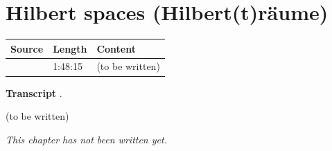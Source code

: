 \chapter{Hilbert spaces (Hilbert(t)räume)}\label{ch:c05}
\begin{paracol}{2}

\begin{sources}
\begin{tabularx}{\linewidth}{@{}l l L@{}}
\toprule
\textbf{Source} & \textbf{Length} & \textbf{Content}\\
\midrule
{} & 1:48:15 & (to be written)\\
\bottomrule
\end{tabularx}

\smallskip
\textbf{Transcript} .
\end{sources}

\begin{reading}
(to be written)
\end{reading}

\emph{This chapter has not been written yet.}

\flushside
\end{paracol}
